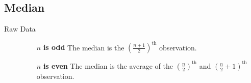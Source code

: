 \documentclass[
10pt, %
a4paper, %
]{report}
\begin{document}
\subsection{Median}
\begin{description}
\item[Raw Data]
\begin{itemize}
\item[]
\item[\(n\) \textbf{is odd}] The median is the \(\left( \frac{n+1}{2} \right)^\text{th}\) observation.

\item[\(n\) \textbf{is even}]  The median is the average of the \(\left( \frac{n}{2} \right)^\text{th}\) and \(\left( \frac{n}{2} + 1 \right)^\text{th}\) observation.
\end{itemize}



\end{description}
\end{document}

